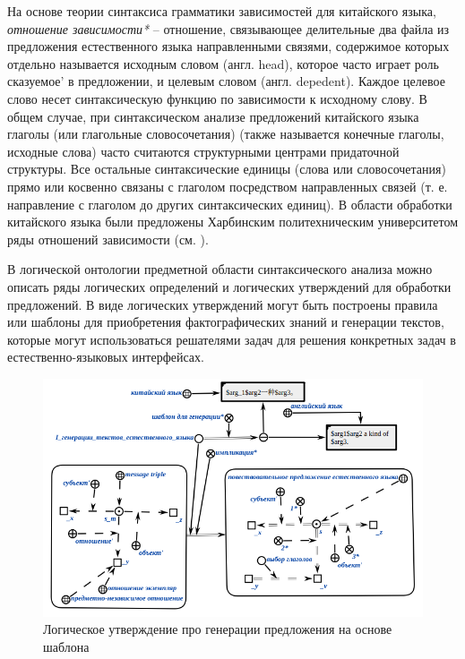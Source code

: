 На основе теории синтаксиса грамматики зависимостей для китайского языка, \textit{отношение зависимости*} -- отношение, связывающее делительные два файла из предложения естественного языка направленными связями, содержимое которых отдельно называется исходным словом (англ. head), которое часто играет роль сказуемое' в предложении, и целевым словом (англ. depedent). Каждое целевое слово несет синтаксическую функцию по зависимости к исходному слову. В общем случае, при синтаксическом анализе предложений китайского языка глаголы (или глагольные словосочетания) (также называется конечные глаголы, исходные слова) часто считаются структурными центрами придаточной структуры. Все остальные синтаксические единицы (слова или словосочетания) прямо или косвенно связаны с глаголом посредством направленных связей (т. е. направление с глаголом до других синтаксических единиц). В области обработки китайского языка были предложены Харбинским политехническим университетом ряды отношений зависимости (см. ).

В логической онтологии предметной области синтаксического анализа можно описать ряды логических определений и логических утверждений для обработки предложений. В виде логических утверждений могут быть построены правила или шаблоны для приобретения фактографических знаний и генерации текстов, которые могут использоваться решателями задач для решения конкретных задач в естественно-языковых интерфейсах.
\begin{figure}[H]
	\centering
	\includegraphics[scale=0.8]{images/part4/chapter_chinese/ruleGeneration.png}
	\caption{Логическое утверждение про генерации предложения на основе шаблона}
	\label{fig:template-generation}
\end{figure}

